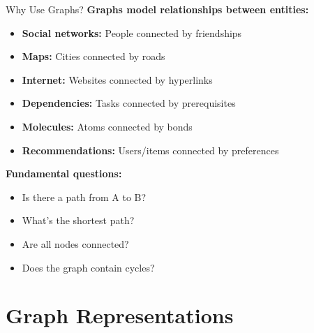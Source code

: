 \documentclass[aspectratio=169]{beamer}
\begin{document}
\begin{frame}{Why Use Graphs?}
  \textbf{Graphs model relationships between entities:}

  \vspace{0.3cm}
  \begin{itemize}
    \item \textbf{Social networks:} People connected by friendships
    \item \textbf{Maps:} Cities connected by roads
    \item \textbf{Internet:} Websites connected by hyperlinks
    \item \textbf{Dependencies:} Tasks connected by prerequisites
    \item \textbf{Molecules:} Atoms connected by bonds
    \item \textbf{Recommendations:} Users/items connected by preferences
  \end{itemize}

  \vspace{0.3cm}
  \textbf{Fundamental questions:}
  \begin{itemize}
    \item Is there a path from A to B?
    \item What's the shortest path?
    \item Are all nodes connected?
    \item Does the graph contain cycles?
  \end{itemize}
\end{frame}

\section{Graph Representations}
\end{document}
